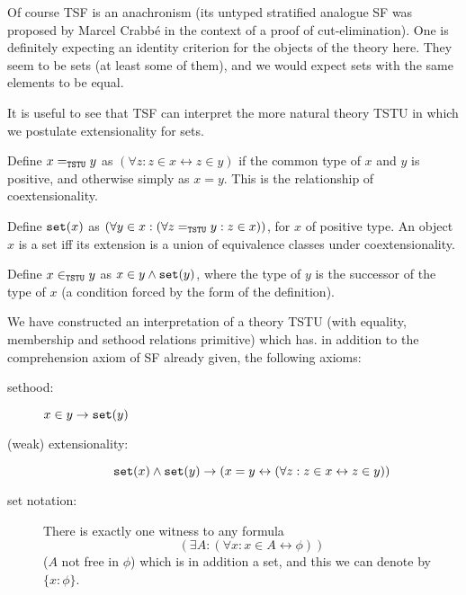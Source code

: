 \documentclass{slides}
\begin{document}
\begin{slide}

Of course TSF is an anachronism (its untyped stratified analogue SF was proposed by Marcel Crabb\'e in the context of a proof of cut-elimination).  One is definitely expecting an identity criterion for the objects of the theory here.  They seem to be sets (at least some of them), and we would expect sets with the same elements to be equal. 

It is useful to see that TSF can interpret the more natural theory TSTU in which we postulate extensionality for sets.

Define $x =_{\tt TSTU} y$ as $(\forall z:z \in x \leftrightarrow z \in y)$ if the common type of $x$ and $y$ is positive, and otherwise simply as $x=y$.  This is the relationship of coextensionality.

Define ${\tt set}(x)$ as $(\forall y \in x:(\forall z =_{\tt TSTU} y:z \in x))$, for $x$ of positive type.  An object $x$ is a set iff
its extension is a union of equivalence classes under coextensionality.

Define $x \in_{\tt TSTU} y$ as $x \in y \wedge {\tt set}(y)$, where the type of $y$ is the successor of the type of $x$ (a condition forced by the form of the definition).

We have constructed an interpretation of a theory TSTU
(with equality, membership and sethood relations primitive) which has. in addition to the comprehension axiom of SF already given,
the following axioms:

\begin{description}

\item[sethood:]  $x \in y \rightarrow {\tt set}(y)$

\item[(weak) extensionality:]  $${\tt set}(x) \wedge {\tt set}(y) \rightarrow (x=y \leftrightarrow (\forall z:z \in x \leftrightarrow z \in y))$$

\item[set notation:]  There is exactly one witness to any formula $$(\exists A:(\forall x:x \in A \leftrightarrow \phi))$$ ($A$ not free in $\phi$) which is in addition a set, and this we can denote by $\{x:\phi\}$. 

\end{description}


\end{slide}
\end{document}
